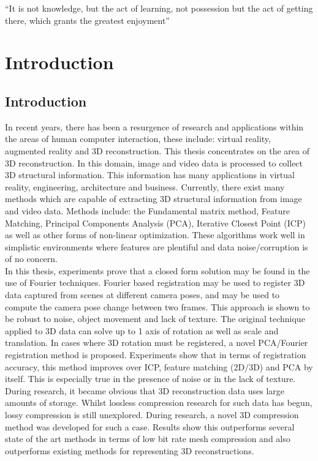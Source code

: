\begin{savequote}[8cm]
  ``It is not knowledge, but the act of learning, not possession but the act of getting there, which grants the greatest enjoyment''
\end{savequote}
\makeatletter
\chapter{Introduction}

\section{Introduction}

In recent years, there has been a resurgence of research and applications within the areas of human computer interaction, these include: virtual reality, augmented reality and 3D reconstruction. This thesis concentrates on the area of 3D reconstruction. In this domain, image and video data is processed to collect 3D structural information. This information has many applications in virtual reality, engineering, architecture and business. Currently, there exist many methods which are capable of extracting 3D structural information from image and video data. Methods include: the Fundamental matrix method, Feature Matching, Principal Components Analysis (PCA), Iterative Closest Point (ICP) as well as other forms of non-linear optimization. These algorithms work well in simplistic environments where features are plentiful and data noise/corruption is of no concern. \\

In this thesis, experiments prove that a closed form solution may be found in the use of Fourier techniques. Fourier based registration may be used to register 3D data captured from scenes at different camera poses, and may be used to compute the camera pose change between two frames. This approach is shown to be robust to noise, object movement and lack of texture. The original technique applied to 3D data can solve up to 1 axis of rotation as well as scale and translation. In cases where 3D rotation must be registered, a novel PCA/Fourier registration method is proposed. Experiments show that in terms of registration accuracy, this method improves over ICP, feature matching (2D/3D) and PCA by itself. This is especially true in the presence of noise or in the lack of texture. \\

During research, it became obvious that 3D reconstruction data uses large amounts of storage. Whilst lossless compression research for such data has begun, lossy compression is still unexplored. During research, a novel 3D compression method was developed for such a case. Results show this outperforms several state of the art methods in terms of low bit rate mesh compression and also outperforms existing methods for representing 3D reconstructions. \\

